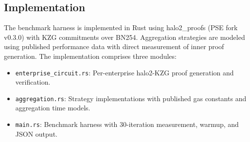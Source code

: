 \subsection{Implementation}

The benchmark harness is implemented in Rust using halo2\_proofs (PSE
fork v0.3.0) with KZG commitments over BN254. Aggregation strategies
are modeled using published performance data with direct measurement of
inner proof generation. The implementation comprises three modules:

\begin{itemize}
  \item \texttt{enterprise\_circuit.rs}: Per-enterprise halo2-KZG proof
    generation and verification.
  \item \texttt{aggregation.rs}: Strategy implementations with published
    gas constants and aggregation time models.
  \item \texttt{main.rs}: Benchmark harness with 30-iteration
    measurement, warmup, and JSON output.
\end{itemize}
